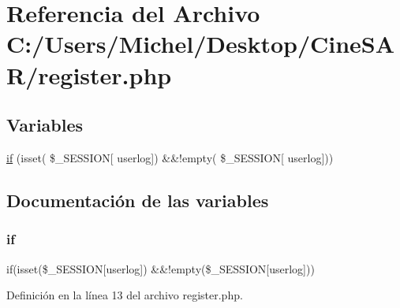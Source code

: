 \hypertarget{register_8php}{}\section{Referencia del Archivo C\+:/\+Users/\+Michel/\+Desktop/\+Cine\+S\+A\+R/register.php}
\label{register_8php}
\subsection*{Variables}
\begin{DoxyCompactItemize}
\item 
\mbox{\hyperlink{register_8php_aefb5893336d7ead40ae915367f4b82cc}{if}} (isset( \$\+\_\+\+S\+E\+S\+S\+I\+ON\mbox{[} \textquotesingle{}userlog\textquotesingle{}\mbox{]}) \&\&!empty( \$\+\_\+\+S\+E\+S\+S\+I\+ON\mbox{[} \textquotesingle{}userlog\textquotesingle{}\mbox{]}))
\end{DoxyCompactItemize}


\subsection{Documentación de las variables}
\mbox{\label{register_8php_aefb5893336d7ead40ae915367f4b82cc}} 
\subsubsection{\texorpdfstring{if}{if}}
{\footnotesize\ttfamily if(isset(\$\+\_\+\+S\+E\+S\+S\+I\+ON\mbox{[}\textquotesingle{}userlog\textquotesingle{}\mbox{]}) \&\&!empty(\$\+\_\+\+S\+E\+S\+S\+I\+ON\mbox{[}\textquotesingle{}userlog\textquotesingle{}\mbox{]}))}



Definición en la línea 13 del archivo register.\+php.

